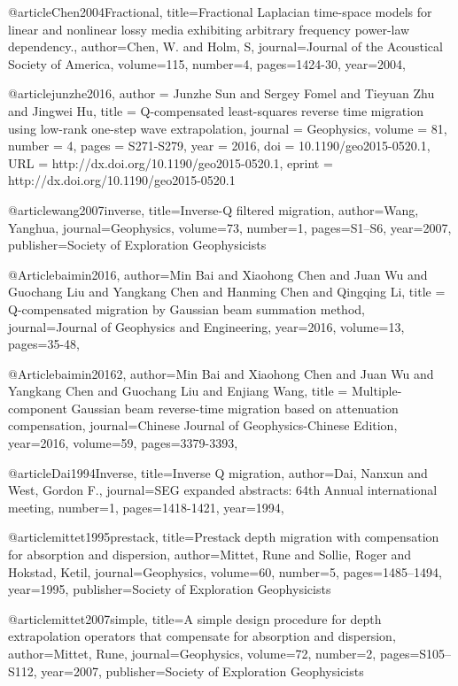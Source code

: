 {@article{Chen2004Fractional,
  title={Fractional Laplacian time-space models for linear and nonlinear lossy media exhibiting arbitrary frequency power-law dependency.},
  author={Chen, W. and Holm, S},
  journal={Journal of the Acoustical Society of America},
  volume={115},
  number={4},
  pages={1424-30},
  year={2004},
}

@article{junzhe2016,
author = {Junzhe Sun and Sergey Fomel and Tieyuan Zhu and Jingwei Hu},
title = {Q-compensated least-squares reverse time migration using low-rank one-step wave extrapolation},
journal = {Geophysics},
volume = {81},
number = {4},
pages = {S271-S279},
year = {2016},
doi = {10.1190/geo2015-0520.1},
URL = {http://dx.doi.org/10.1190/geo2015-0520.1},
eprint = {http://dx.doi.org/10.1190/geo2015-0520.1}
}

@article{wang2007inverse,
  title={Inverse-{Q} filtered migration},
  author={Wang, Yanghua},
  journal={Geophysics},
  volume={73},
  number={1},
  pages={S1--S6},
  year={2007},
  publisher={Society of Exploration Geophysicists}
}

@Article{baimin2016,
  author={Min Bai and Xiaohong Chen and Juan Wu and Guochang Liu and Yangkang Chen and Hanming Chen and Qingqing Li},
  title = {Q-compensated migration by Gaussian beam summation method},
  journal={Journal of Geophysics and Engineering},
  year=2016,
  volume=13,
  pages={35-48},
}

@Article{baimin20162,
  author={Min Bai and Xiaohong Chen and Juan Wu and Yangkang Chen and Guochang Liu and  Enjiang Wang},
  title = {Multiple-component Gaussian beam reverse-time migration based on attenuation compensation},
  journal={Chinese Journal of Geophysics-Chinese Edition},
  year=2016,
  volume=59,
  pages={3379-3393},
}

@article{Dai1994Inverse,
  title={Inverse {Q} migration},
  author={Dai, Nanxun and West, Gordon F.},
  journal={SEG expanded abstracts: 64th Annual international meeting},
  number={1},
  pages={1418-1421},
  year={1994},
}

@article{mittet1995prestack,
  title={Prestack depth migration with compensation for absorption and dispersion},
  author={Mittet, Rune and Sollie, Roger and Hokstad, Ketil},
  journal={Geophysics},
  volume={60},
  number={5},
  pages={1485--1494},
  year={1995},
  publisher={Society of Exploration Geophysicists}
}

@article{mittet2007simple,
  title={A simple design procedure for depth extrapolation operators that compensate for absorption and dispersion},
  author={Mittet, Rune},
  journal={Geophysics},
  volume={72},
  number={2},
  pages={S105--S112},
  year={2007},
  publisher={Society of Exploration Geophysicists}
}

}
